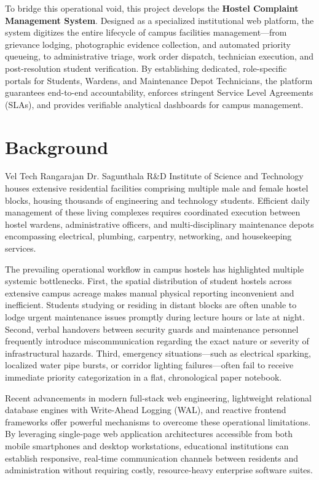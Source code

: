 \documentclass[10pt]{report}
\begin{document}
To bridge this operational void, this project develops the \textbf{Hostel Complaint Management System}. Designed as a specialized institutional web platform, the system digitizes the entire lifecycle of campus facilities management---from grievance lodging, photographic evidence collection, and automated priority queueing, to administrative triage, work order dispatch, technician execution, and post-resolution student verification. By establishing dedicated, role-specific portals for Students, Wardens, and Maintenance Depot Technicians, the platform guarantees end-to-end accountability, enforces stringent Service Level Agreements (SLAs), and provides verifiable analytical dashboards for campus management.

\section{Background}
\hspace{0.5cm}Vel Tech Rangarajan Dr. Sagunthala R\&D Institute of Science and Technology houses extensive residential facilities comprising multiple male and female hostel blocks, housing thousands of engineering and technology students. Efficient daily management of these living complexes requires coordinated execution between hostel wardens, administrative officers, and multi-disciplinary maintenance depots encompassing electrical, plumbing, carpentry, networking, and housekeeping services.

The prevailing operational workflow in campus hostels has highlighted multiple systemic bottlenecks. First, the spatial distribution of student hostels across extensive campus acreage makes manual physical reporting inconvenient and inefficient. Students studying or residing in distant blocks are often unable to lodge urgent maintenance issues promptly during lecture hours or late at night. Second, verbal handovers between security guards and maintenance personnel frequently introduce miscommunication regarding the exact nature or severity of infrastructural hazards. Third, emergency situations---such as electrical sparking, localized water pipe bursts, or corridor lighting failures---often fail to receive immediate priority categorization in a flat, chronological paper notebook. 

Recent advancements in modern full-stack web engineering, lightweight relational database engines with Write-Ahead Logging (WAL), and reactive frontend frameworks offer powerful mechanisms to overcome these operational limitations. By leveraging single-page web application architectures accessible from both mobile smartphones and desktop workstations, educational institutions can establish responsive, real-time communication channels between residents and administration without requiring costly, resource-heavy enterprise software suites.
\end{document}
